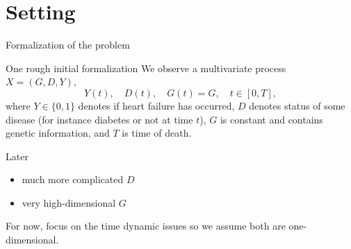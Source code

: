 \documentclass{beamer}\usepackage{listings}
\begin{document}
\section{Setting}
\label{sec:org4bd22e3}
\begin{frame}[label={sec:orgca8c267}]{Formalization of the problem}
\begin{block}{One rough initial formalization}
We observe a multivariate process $ X = (G, D, Y)$,
\begin{equation*}
  Y(t), \quad D(t), \quad G(t) = G, \quad t \in [0, T],
\end{equation*}
where $Y \in \{0, 1\}$ denotes if heart failure has occurred, $D$ denotes status of some disease
(for instance diabetes or not at time $t$), $G$ is constant and contains genetic information, and
$T$ is time of death.
\pause
\end{block}

\begin{block}{Later}
\begin{itemize}
\item much more complicated \(D\)
\item very high-dimensional \(G\)
\end{itemize}

For now, focus on the time dynamic issues so we assume both are one-dimensional.
\end{block}
\end{frame}
\end{document}
